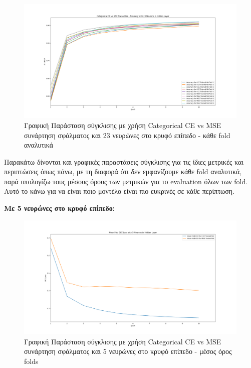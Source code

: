 \documentclass[12pt,a4paper]{article}
\begin{document}
\begin{figure}[H]
	\includegraphics[width=\textwidth]{9. CCE vs MSE - Accuracy - 23 Neurons.png}
	\caption{Γραφική Παράσταση σύγκλισης με χρήση Categorical CE vs MSE συνάρτηση σφάλματος και 23 νευρώνες στο κρυφό επίπεδο - κάθε fold αναλυτικά}
\end{figure}

Παρακάτω δίνονται και γραφικές παραστάσεις σύγκλισης για τις ίδιες μετρικές και περιπτώσεις όπως πάνω, με τη διαφορά ότι δεν εμφανίζουμε κάθε fold αναλυτικά, παρά υπολογίζω τους μέσους όρους των μετρικών για το evaluation όλων των fold. Αυτό το κάνω για να είναι ποιο μοντέλο είναι πιο ευκρινές σε κάθε περίπτωση.

\textbf{Με 5 νευρώνες στο κρυφό επίπεδο:}

\begin{figure}[H]
	\includegraphics[width=\textwidth]{10. CCE vs MSE - CCE Loss - 5 Neurons - Mean.png}
	\caption{Γραφική Παράσταση σύγκλισης με χρήση Categorical CE vs MSE συνάρτηση σφάλματος και 5 νευρώνες στο κρυφό επίπεδο - μέσος όρος folds}
\end{figure}
\end{document}
